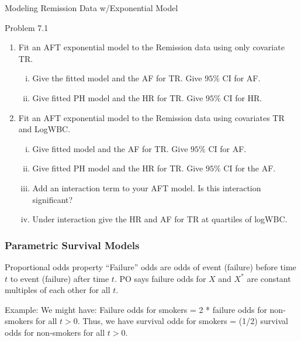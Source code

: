 \documentclass{beamer}
\theoremstyle{definition}
\begin{document}
 \begin{frame}{Modeling Remission Data w/Exponential Model}
\begin{block}{Problem 7.1}
\begin{enumerate}
\item Fit an AFT exponential model to the Remission data using only covariate TR.
\begin{enumerate}[i.]
\item Give the fitted model and the AF for TR. Give $95\%$ CI for AF.
\item Give fitted PH model and the HR  for TR. Give $95\%$ CI for HR.
\end{enumerate}
\item Fit an AFT exponential model to the Remission data using covariates TR and LogWBC.
\begin{enumerate}[i.]
\item Give fitted model and the AF for TR. Give $95\%$ CI for AF.
\item Give fitted PH model and the HR for TR. Give $95\%$ CI for the AF.
\item Add an interaction term to your AFT model. Is this interaction significant?
\item Under interaction give the HR and AF for TR at quartiles of logWBC.
\end{enumerate}
\end{enumerate}
 \end{block}
 \end{frame}



\begin{frame}
\frametitle{Parametric Survival Models}
\begin{block}{Proportional odds property}
``Failure'' odds are odds of event (failure) before time $t$ to event (failure) after time $t$. PO says failure odds for $X$ and $X^*$ are constant multiples of each other for all $t$.
\vspace{10pt}

Example: We might have: Failure odds for smokers = 2 * failure odds for non-smokers for all $t>0$. Thus, we have survival odds for smokers = (1/2) survival odds for non-smokers for all $t>0$.
\end{block}
\end{frame}
\end{document}
